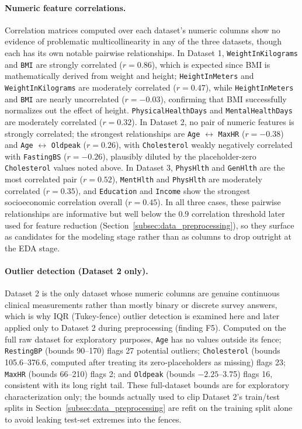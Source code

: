 \begin{sloppypar}
\paragraph{Numeric feature correlations.} Correlation matrices computed over
each dataset's numeric columns show no evidence of problematic
multicollinearity in any of the three datasets, though each has its own
notable pairwise relationships. In Dataset 1, \texttt{WeightInKilograms} and
\texttt{BMI} are strongly correlated ($r = 0.86$), which is expected since BMI
is mathematically derived from weight and height; \texttt{HeightInMeters} and
\texttt{WeightInKilograms} are moderately correlated ($r = 0.47$), while
\texttt{HeightInMeters} and \texttt{BMI} are nearly uncorrelated
($r = -0.03$), confirming that BMI successfully normalizes out the effect of
height. \texttt{PhysicalHealthDays} and \texttt{MentalHealthDays} are
moderately correlated ($r = 0.32$). In Dataset 2, no pair of numeric features
is strongly correlated; the strongest relationships are \texttt{Age}
$\leftrightarrow$ \texttt{MaxHR} ($r = -0.38$) and \texttt{Age}
$\leftrightarrow$ \texttt{Oldpeak} ($r = 0.26$), with \texttt{Cholesterol}
weakly negatively correlated with \texttt{FastingBS} ($r = -0.26$), plausibly
diluted by the placeholder-zero \texttt{Cholesterol} values noted above. In
Dataset 3, \texttt{PhysHlth} and \texttt{GenHlth} are the most correlated pair
($r = 0.52$), \texttt{MentHlth} and \texttt{PhysHlth} are moderately
correlated ($r = 0.35$), and \texttt{Education} and \texttt{Income} show the
strongest socioeconomic correlation overall ($r = 0.45$). In all three cases,
these pairwise relationships are informative but well below the
$0.9$ correlation threshold later used for feature reduction
(Section~\ref{subsec:data_preprocessing}), so they surface as candidates for
the modeling stage rather than as columns to drop outright at the EDA stage.

\paragraph{Outlier detection (Dataset 2 only).} Dataset 2 is the only dataset
whose numeric columns are genuine continuous clinical measurements rather than
mostly binary or discrete survey answers, which is why IQR (Tukey-fence)
outlier detection is examined here and later applied only to Dataset 2 during
preprocessing (finding F5). Computed on the full raw dataset for exploratory
purposes, \texttt{Age} has no values outside its fence; \texttt{RestingBP}
(bounds 90--170) flags 27 potential outliers; \texttt{Cholesterol} (bounds
105.6--376.6, computed after treating its zero-placeholders as missing) flags
23; \texttt{MaxHR} (bounds 66--210) flags 2; and \texttt{Oldpeak} (bounds
$-2.25$--3.75) flags 16, consistent with its long right tail. These
full-dataset bounds are for exploratory characterization only; the bounds
actually used to clip Dataset 2's train/test splits in
Section~\ref{subsec:data_preprocessing} are refit on the training split alone
to avoid leaking test-set extremes into the fences.


\end{sloppypar}

